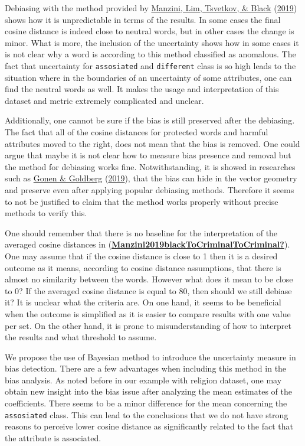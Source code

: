 \documentclass[
  12pt,
]{book}
\begin{document}
Debiasing with the method provided by \protect\hyperlink{ref-Manzini2019blackToCriminal}{Manzini, Lim, Tsvetkov, \& Black} (\protect\hyperlink{ref-Manzini2019blackToCriminal}{2019}) shows how it is unpredictable in terms of the results.
In some cases the final cosine distance is indeed close to neutral words, but in other cases the change is minor. What is more, the inclusion of the uncertainty shows how in some cases it is not clear why a word is according to this method
classified as anomalous. The fact that uncertainty for \texttt{assosiated} and \texttt{different} class is so high leads to the situation where in the boundaries of an uncertainty of some attributes, one can find the neutral words as well. It makes the usage and interpretation of this dataset and metric extremely complicated and unclear.

Additionally, one cannot be sure if the bias is still preserved after the debiasing. The fact that all of the cosine distances for protected words and harmful attributes moved to the right, does not mean that the bias is removed. One could argue that maybe it is not clear how to measure bias presence and removal but the method for debiasing works fine. Notwithstanding, it is showed in researches such as \protect\hyperlink{ref-Gonen2019Lipstick}{Gonen \& Goldberg} (\protect\hyperlink{ref-Gonen2019Lipstick}{2019}), that the bias can hide in the vector geometry and preserve even after applying popular debiasing methods. Therefore it seems to not be justified to claim that the method works properly without precise methods to verify this.

One should remember that there is no baseline for the interpretation of the averaged cosine distances in (\protect\hyperlink{ref-Manzini2019blackToCriminalToCriminal}{\textbf{Manzini2019blackToCriminalToCriminal?}}). One may assume that if the cosine distance is close to 1 then it is a desired outcome as it means, according to cosine distance assumptions, that there is almost no similarity between the words. However what does it mean to be close to 0? If the averaged cosine distance is equal to 80, then should we still debiase it? It is unclear what the criteria are. On one hand, it seems to be beneficial when the outcome is simplified as it is easier to compare results with one value per set. On the other hand, it is prone to misunderstanding of how to interpret the results and what threshold to assume.

We propose the use of Bayesian method to introduce the uncertainty measure in bias detection. There are a few advantages when including this method in the bias analysis. As noted before in our example with religion dataset, one may obtain new insight into the bias issue after analyzing the mean estimates of the coeﬀicients. There seems to be a minor difference for the mean concerning the \texttt{assosiated} class. This can lead to the conclusions that we do not have strong reasons to perceive lower cosine distance as significantly related to the fact that the attribute is associated.
\end{document}
